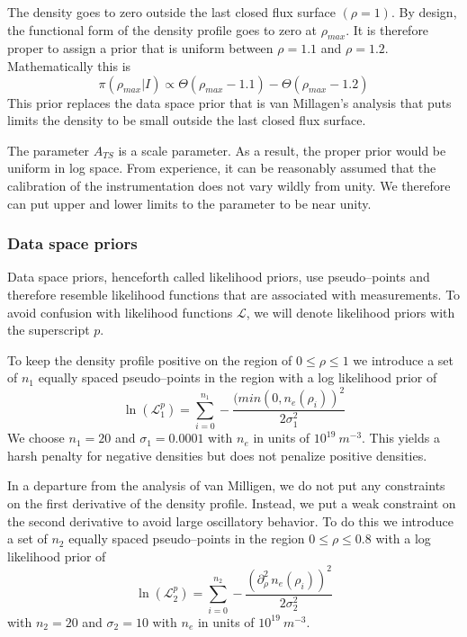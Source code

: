\documentclass[12pt]{article}
\numberwithin{equation}{section}
\begin{document}
The density goes to zero outside the last closed flux surface $(\rho=1)$. By design, the functional form of the density profile goes to zero at $\rho_{max}$. It is therefore proper to assign a prior that is uniform between $\rho = 1.1$ and $\rho = 1.2$. Mathematically this is
\begin{equation} \label{eq:rhomaxprior}
	\pi(\rho_{max}|I) \propto \Theta(\rho_{max}-1.1)-\Theta(\rho_{max} - 1.2)
\end{equation}
This prior replaces the data space prior that is van Millagen's analysis that puts limits the density to be small outside the last closed flux surface. 

The parameter $A_{TS}$ is a scale parameter. As a result, the proper prior would be uniform in log space. From experience, it can be reasonably assumed that the calibration of the instrumentation does not vary wildly from unity. We therefore can put upper and lower limits to the parameter to be near unity. 
\subsubsection{Data space priors}
Data space priors, henceforth called likelihood priors, use pseudo--points and therefore resemble likelihood functions that are associated with measurements. To avoid confusion with likelihood functions $\mathcal{L}$, we will denote likelihood priors with the superscript $p$. 

To keep the density profile positive on the region of $0 \le \rho \le 1$ we introduce a set of $n_1$ equally spaced pseudo--points in the region with a log likelihood prior of 
\begin{equation} \label{eq:pos_prior}
	\ln(\mathcal{L}^p_1) = \sum \limits_{i=0}^{n_1} -\frac{(min(0,n_e(\rho_i))^2}{2 \sigma_1^2}
\end{equation}  
We choose $n_1=20$ and $\sigma_1 = 0.0001$ with $n_e$ in units of $10^{19}\: m^{-3}$. This yields a harsh penalty for negative densities but does not penalize positive densities. 

In a departure from the analysis of van Milligen, we do not put any constraints on the first derivative of the density profile. Instead, we put a weak constraint on the second derivative to avoid large oscillatory behavior. To do this we introduce a set of $n_2$ equally spaced pseudo--points in the region $0 \le \rho \le 0.8$ with a log likelihood prior of
\begin{equation} \label{eq:second_prior}
	\ln(\mathcal{L}^p_2) = \sum \limits_{i=0}^{n_2}-\frac{(\partial^2_{\rho}\, n_e(\rho_i))^2}{2 \sigma_2^2}
\end{equation} 
with $n_2=20$ and $\sigma_2=10$ with $n_e$ in units of $10^{19}\: m^{-3}$. 
\end{document}
